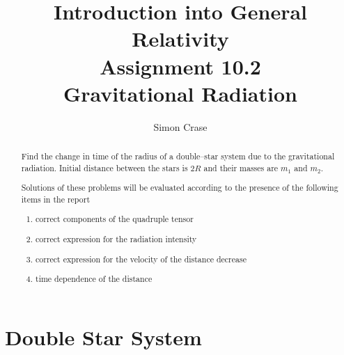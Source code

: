 \documentclass[]{article}
\title{Introduction into General Relativity\\Assignment 10.2\\Gravitational Radiation}
\author{Simon Crase}
\begin{document}
\maketitle

\begin{abstract}
Find the change in time of the radius of a double--star system due to the gravitational radiation. Initial distance between the stars is $2R$ and their masses are $m_1$ and $m_2$.

Solutions of these problems will be evaluated according to the presence of the following items in the report
\begin{enumerate}
	\item correct components of the quadruple tensor
	\item correct expression for the radiation intensity
	\item correct expression for the velocity of the distance decrease
	\item time dependence of the distance
\end{enumerate}
\end{abstract}

\section{Double Star System}
\end{document}
